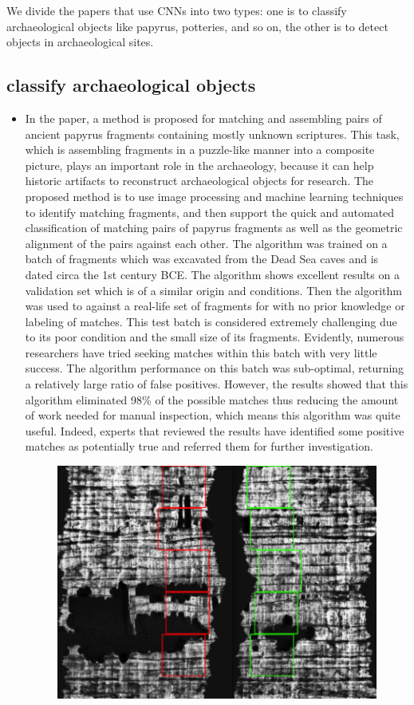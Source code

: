 \documentclass[journal]{IEEEtran}
\begin{document}
	We divide the papers that use CNNs into two types: one is to classify archaeological objects like papyrus, potteries, and so on, the other is to detect objects in archaeological sites.

	\subsection{classify archaeological objects}

	\begin{itemize}
	\item In the paper\cite{Papyrus}, a method is proposed for matching and assembling pairs of ancient papyrus fragments containing mostly unknown scriptures.
		  This task, which is assembling fragments in a puzzle-like manner into a composite picture, plays an important role in the archaeology, because it can help historic artifacts to reconstruct archaeological objects for research.
		  The proposed method is to use image processing and machine learning techniques to identify matching fragments, and then support the quick and automated classification of matching pairs of papyrus fragments as well
		  as the geometric alignment of the pairs against each other. The algorithm was trained on a batch of fragments which was excavated from the Dead Sea caves and is dated circa the 1st
		  century BCE. The algorithm shows excellent results on a validation set which is of a similar origin and conditions.
		  Then the algorithm was used to  against a real-life set of fragments for with no prior knowledge or labeling of matches.
		  This test batch is considered extremely challenging due to its poor condition and the small size of its fragments. Evidently,
		  numerous researchers have tried seeking matches within this batch with very little success. The algorithm performance on
		  this batch was sub-optimal, returning a relatively large ratio of false positives. However, the results showed that this algorithm
		  eliminated 98\% of the possible matches thus reducing the amount of work needed for manual inspection, which means this algorithm was quite useful. Indeed, experts that
		  reviewed the results have identified some positive matches as potentially true and referred them for further investigation.
		  \begin{figure}[htbp]
			\centering
			\includegraphics[width=0.9\linewidth]{./picture/fig1.png}

\end{figure}
\end{itemize}
\end{document}
